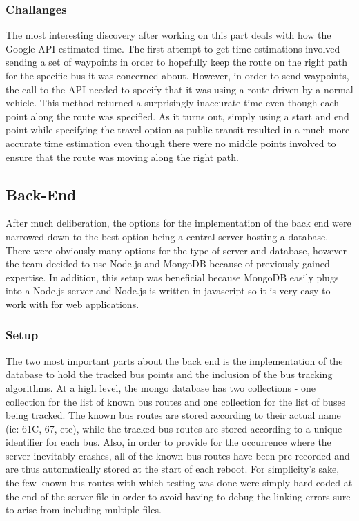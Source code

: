 \documentclass[pageno]{jpaper}
\begin{document}
\subsubsection{Challanges}
The most interesting discovery after working on this part deals with how the 
Google API estimated time. The first attempt to get time estimations involved sending a 
set of waypoints in order to hopefully keep the route on the right path for the specific 
bus it was concerned about. However, in order to send waypoints, the call to the API 
needed to specify that it was using a route driven by a normal vehicle. This method 
returned a surprisingly inaccurate time even though each point along the route was 
specified. As it turns out, simply using a start and end point while specifying the travel 
option as public transit resulted in a much more accurate time estimation even though 
there were no middle points involved to ensure that the route was moving along the 
right path.

\subsection{Back-End}

After much deliberation, the options for the implementation of the back end were 
narrowed down to the best option being a central server hosting a database. There 
were obviously many options for the type of server and database, however the team 
decided to use Node.js and MongoDB because of previously gained expertise. In 
addition, this setup was beneficial because MongoDB easily plugs into a Node.js server 
and Node.js is written in javascript so it is very easy to work with for web applications.
\subsubsection{Setup}
The two most important parts about the back end is the implementation of the
database to hold the tracked bus points and the inclusion of the bus tracking algorithms. 
At a high level, the mongo database has two collections - one collection for the list of 
known bus routes and one collection for the list of buses being tracked. The known bus 
routes are stored according to their actual name (ie: 61C, 67, etc), while the tracked bus 
routes are stored according to a unique identifier for each bus. Also, in order to provide 
for the occurrence where the server inevitably crashes, all of the known bus routes have 
been pre-recorded and are thus automatically stored at the start of each reboot. For 
simplicity’s sake, the few known bus routes with which testing was done were simply 
hard coded at the end of the server file in order to avoid having to debug the linking 
errors sure to arise from including multiple files.
\end{document}
